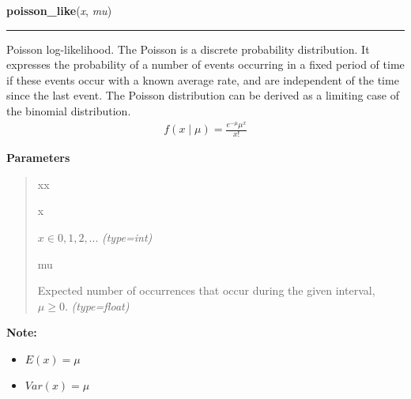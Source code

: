     \begin{boxedminipage}{\textwidth}

    \raggedright \textbf{poisson\_like}(\textit{x}, \textit{mu})

    \vspace{-1.5ex}

    \rule{\textwidth}{0.5\fboxrule}

Poisson log-likelihood. The Poisson is a discrete probability distribution.
It expresses the probability of a number of events occurring in a fixed
period of time if these events occur with a known average rate, and are
independent of the time since the last event. The Poisson distribution can
be derived as a limiting case of the binomial distribution.
\begin{equation*}\begin{split}f(x \mid \mu) = \frac{e^{-\mu}\mu^x}{x!}\end{split}\end{equation*}    \vspace{1ex}

      \textbf{Parameters}
      \begin{quote}
        \begin{Ventry}{xx}

          \item[x]


$x \in {0,1,2,...}$
            \textit{(type=int)}

          \item[mu]


Expected number of occurrences that occur during the given interval,
$\mu \geq 0$.
            \textit{(type=float)}

        \end{Ventry}

      \end{quote}

    \vspace{1ex}

\textbf{Note:} \begin{itemize}
\item {} 
$E(x)=\mu$

\item {} 
$Var(x)=\mu$

\end{itemize}


    \end{boxedminipage}

    \label{pymc:distributions:rtruncnorm}

